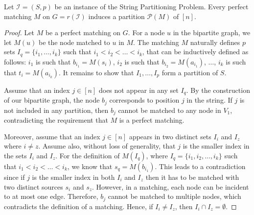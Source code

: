 \begin{lemma} \label{lemma:matching_induces_partition}
    Let $\mathcal{I}=(S, p)$ be an instance of the String Partitioning Problem. Every perfect matching $M$ on $G = r(\mathcal{I})$ induces a partition $\mathcal{P}(M)$ of $[n]$.
\end{lemma}
\begin{proof}
    Let $M$ be a perfect matching on $G$. For a node $u$ in the bipartite graph, we let $M(u)$ be the node matched to $u$ in $M$. The matching $M$ naturally defines $p$ sets $I_q=\{i_1,\dots,i_k\}$ such that $i_1 <i_2<\dots<i_k$, that can be inductively defined as follows: $i_1$ is such that $b_{i_1} = M(s_i)$, $i_2$ is such that $b_{i_2} = M(a_{i_1})$, $\dots$, $i_k$ is such that $t_i = M(a_{i_k})$. It remains to show that $I_1,\dots,I_p$ form a partition of $S$.

    Assume that an index $j \in [n]$ does not appear in any set $I_q$. By the construction of our bipartite graph, the node $b_j$ corresponds to position $j$ in the string. If $j$ is not included in any partition, then $b_j$ cannot be matched to any node in $V_1$, contradicting the requirement that $M$ is a perfect matching. 
    
    Moreover, assume that an index $j \in [n]$ appears in two distinct sets $I_i$ and $I_z$ where $i \neq z$. Assume also, without loss of generality, that $j$ is the smaller index in the sets $I_i$ and $I_z$. For the definition of $M(I_q)$, where $I_q=\{i_1, i_2, \dots, i_k\}$ such that $i_1 <i_2<\dots<i_k$, we know that $s_q = M(b_{i_1})$. This leads to a contradiction since if $j$ is the smaller index in both $I_i$ and $I_z$ then it has to be matched with two distinct sources $s_i$ and $s_z$. However, in a matching, each node can be incident to at most one edge. Therefore, $b_j$ cannot be matched to multiple nodes, which contradicts the definition of a matching. Hence, if $I_i \neq I_z$, then $I_i \cap I_z = \emptyset$.
    
    \begin{comment}
    By the inductive definition of the sets, we have: For set $I_i$: $j$ appears as some $i_q$ in the sequence $I_i = \{i_1, i_2, \ldots, i_{|I_i|}\}$ where $i_1 < i_2 < \ldots < i_{|I_i|}$. For set $I_z$: $j$ appears as some $z_l$ in the sequence $I_z = \{z_1, z_2, \ldots, z_{|I_z|}\}$ where $z_1 < z_2 < \ldots < z_{|I_z|}$.


\end{comment}
\end{proof}
